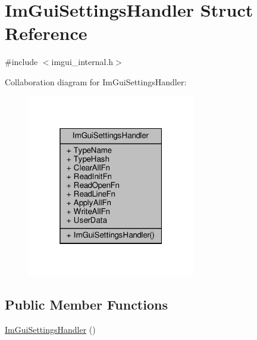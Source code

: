 \hypertarget{structImGuiSettingsHandler}{}\section{Im\+Gui\+Settings\+Handler Struct Reference}
\label{structImGuiSettingsHandler}


{\ttfamily \#include $<$imgui\+\_\+internal.\+h$>$}



Collaboration diagram for Im\+Gui\+Settings\+Handler\+:
\nopagebreak
\begin{figure}[H]
\begin{center}
\leavevmode
\includegraphics[width=208pt]{structImGuiSettingsHandler__coll__graph}
\end{center}
\end{figure}
\subsection*{Public Member Functions}
\begin{DoxyCompactItemize}
\item 
\hyperlink{structImGuiSettingsHandler_ab84610a000c843d4e303e41e260fb1df}{Im\+Gui\+Settings\+Handler} ()
\end{DoxyCompactItemize}
